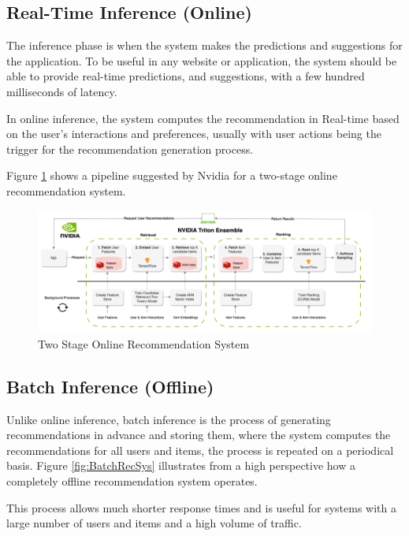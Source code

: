\subsection{Real-Time Inference (Online)}
The inference phase is when the system makes the predictions and suggestions for the application.
To be useful in any website or application, 
the system should be able to provide real-time predictions, 
and suggestions, with a few hundred milliseconds of latency.

In online inference, the system computes the recommendation in Real-time based on the user's interactions and preferences, 
usually with user actions being the trigger for the recommendation generation process.

Figure \ref{fig:TwoStageOnline} shows a pipeline suggested by Nvidia\cite{NvidiaOfflineToOnline} for a two-stage online recommendation system.

\begin{figure}[H]
    \centering
    \includegraphics[width=1\textwidth]{assets/online-two-stage-recommender-pipeline.png}
    \caption[Two Stage Online Recommendation System]{Two Stage Online Recommendation System \cite{NvidiaOfflineToOnline}}
    \label{fig:TwoStageOnline}
\end{figure}



\subsection{Batch Inference (Offline)}
Unlike online inference, batch inference is the process of generating recommendations in advance and storing them, 
where the system computes the recommendations for all users and items, 
the process is repeated on a periodical basis.\cite{NvidiaOfflineToOnline} 
Figure \ref{fig:BatchRecSys} illustrates from a high perspective how a completely offline recommendation system operates.

This process allows much shorter response times and is useful for systems with a large number of users and items and a high volume of traffic.

